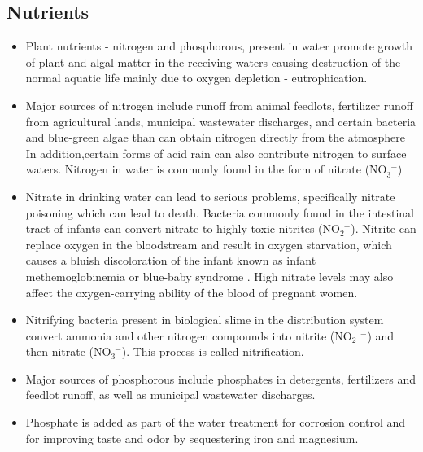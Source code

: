 \subsection{Nutrients}
\begin{itemize}
\item Plant nutrients - nitrogen and phosphorous, present in water promote growth of plant and algal matter in the receiving waters causing destruction of the normal aquatic life mainly due to oxygen depletion - eutrophication.
\item Major sources of nitrogen include runoff from animal feedlots, fertilizer runoff from agricultural lands, municipal wastewater discharges, and certain bacteria and blue-green algae than can obtain nitrogen directly from the atmosphere In addition,certain forms of acid rain can also contribute nitrogen to surface waters. Nitrogen in water is commonly found in the form of nitrate (NO$_3^{\enspace-}$) 
\item Nitrate in drinking water can lead to serious problems, specifically nitrate poisoning which can lead to death. Bacteria commonly found in the intestinal tract of infants can convert nitrate to highly toxic nitrites (NO$_2^{\enspace-}$). Nitrite can replace oxygen in the bloodstream and result in oxygen starvation, which causes a bluish discoloration of the infant known as infant methemoglobinemia or blue-baby syndrome .  High nitrate levels may also affect the oxygen-carrying ability of the blood of pregnant women.
\item Nitrifying bacteria present in biological slime in the distribution system convert ammonia and other nitrogen compounds into nitrite (NO$_2$ $^-$) and then nitrate (NO$_3^{\enspace-}$).  This process is called nitrification. 
\item Major sources of phosphorous include phosphates in detergents, fertilizers and feedlot runoff, as well as municipal wastewater discharges.
\item Phosphate is added as part of the water treatment for corrosion control and for improving taste and odor by sequestering iron and magnesium.

\end{itemize}

